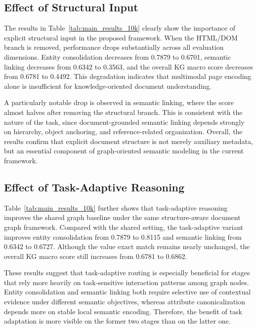 \documentclass[pdflatex,twocolumn,iicol,sn-vancouver-num]{sn-jnl}%
\theoremstyle{thmstyleone}%
\theoremstyle{thmstyletwo}%
\theoremstyle{thmstylethree}%
\begin{document}
\subsection{Effect of Structural Input}

The results in Table~\ref{tab:main_results_10k} clearly show the importance of explicit structural input in the proposed framework. When the HTML/DOM branch is removed, performance drops substantially across all evaluation dimensions. Entity consolidation decreases from 0.7879 to 0.6701, semantic linking decreases from 0.6342 to 0.3563, and the overall KG macro score decreases from 0.6781 to 0.4492. This degradation indicates that multimodal page encoding alone is insufficient for knowledge-oriented document understanding.

A particularly notable drop is observed in semantic linking, where the score almost halves after removing the structural branch. This is consistent with the nature of the task, since document-grounded semantic linking depends strongly on hierarchy, object anchoring, and reference-related organization. Overall, the results confirm that explicit document structure is not merely auxiliary metadata, but an essential component of graph-oriented semantic modeling in the current framework.


\subsection{Effect of Task-Adaptive Reasoning}

Table~\ref{tab:main_results_10k} further shows that task-adaptive reasoning improves the shared graph baseline under the same structure-aware document graph framework. Compared with the shared setting, the task-adaptive variant improves entity consolidation from 0.7879 to 0.8115 and semantic linking from 0.6342 to 0.6727. Although the value exact match remains nearly unchanged, the overall KG macro score still increases from 0.6781 to 0.6862.

These results suggest that task-adaptive routing is especially beneficial for stages that rely more heavily on task-sensitive interaction patterns among graph nodes. Entity consolidation and semantic linking both require selective use of contextual evidence under different semantic objectives, whereas attribute canonicalization depends more on stable local semantic encoding. Therefore, the benefit of task adaptation is more visible on the former two stages than on the latter one.
\end{document}
